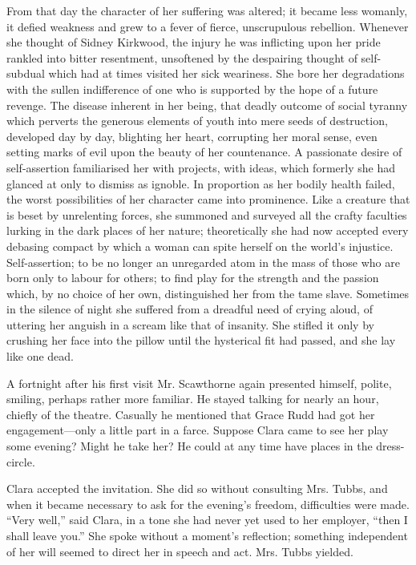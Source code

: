 From that day the character of her suffering was altered; it became less
womanly, it defied weakness and grew to a fever of fierce, unscrupulous
rebellion. Whenever she thought of Sidney Kirkwood, the injury he was
inflicting upon her pride rankled into bitter resentment, unsoftened by
the despairing thought of self- subdual which had at times visited her
sick weariness. She bore her degradations with the sullen indifference
of one who is supported by the hope of a future revenge. The disease
inherent in her being, that deadly outcome of social tyranny which
perverts the generous elements of youth into mere seeds of destruction,
developed day by day, blighting her heart, corrupting her moral sense,
even {}setting marks of evil upon the beauty of her countenance. A
passionate desire of self-assertion familiarised her with projects, with
ideas, which formerly she had glanced at only to dismiss as ignoble. In
proportion as her bodily health failed, the worst possibilities of her
character came into prominence. Like a creature that is beset by
unrelenting forces, she summoned and surveyed all the crafty faculties
lurking in the dark places of her nature; theoretically she had now
accepted every debasing compact by which a woman can spite herself on
the world's injustice. Self-assertion; to be no longer an unregarded
atom in the mass of those who are born only to labour for others; to
find play for the strength and the passion which, by no choice of her
own, distinguished her from the tame slave. Sometimes in the silence of
night she suffered from a dreadful need of crying aloud, of uttering her
anguish in a scream like that of insanity. She stifled it only by
crushing her face into the pillow until the hysterical fit had passed,
and she lay like one dead.

{}A fortnight after his first visit Mr. Scawthorne again presented
himself, polite, smiling, perhaps rather more familiar. He stayed
talking for nearly an hour, chiefly of the theatre. Casually he
mentioned that Grace Rudd had got her engagement---only a little part in
a farce. Suppose Clara came to see her play some evening? Might he take
her? He could at any time have places in the dress-circle.

Clara accepted the invitation. She did so without consulting Mrs. Tubbs,
and when it became necessary to ask for the evening's freedom,
difficulties were made. ``Very well,'' said Clara, in a tone she had
never yet used to her employer, ``then I shall leave you.'' She spoke
without a moment's reflection; something independent of her will seemed
to direct her in speech and act. Mrs. Tubbs yielded.

